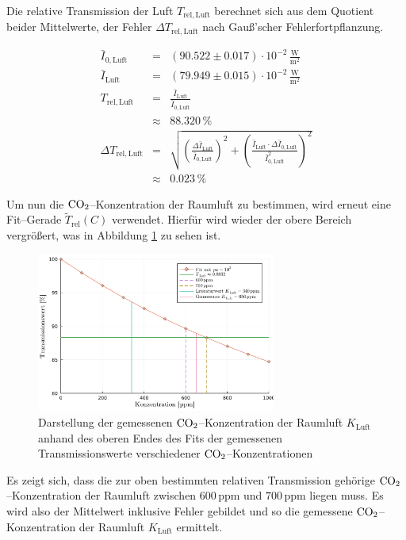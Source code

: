 \documentclass[12pt,a4paper]{scrartcl}
\numberwithin{equation}{section} %
\begin{document}
	Die relative Transmission der Luft $T_\mathrm{rel, Luft}$ berechnet sich aus dem Quotient beider Mittelwerte, der Fehler $\Delta T_\mathrm{rel, Luft}$ nach Gauß'scher Fehlerfortpflanzung.
	
	\begin{eqnarray}
		\bar{I}_{0, \mathrm{Luft}} &=& (90.522\pm 0.017) \cdot 10^{-2} \mathrm{\,\frac{W}{m^2}}\\
		\bar{I}_\mathrm{Luft} &=& (79.949 \pm 0.015) \cdot 10^{-2} \mathrm{\, \frac{W}{m^2}} \\
		T_\mathrm{rel, Luft} &=& \frac{\bar{I}_\mathrm{Luft}}{\bar{I}_{0, \mathrm{Luft}}} \\
		&\approx& 88.320 \mathrm{\, \%} \\
		\Delta T_\mathrm{rel, Luft} &=&
		\sqrt{
			\left(
			\frac{\Delta \bar{I}_\mathrm{Luft}}{\bar{I}_{0, \mathrm{Luft}}}
			\right)^2
			+ \left(
			\frac{\bar{I}_\mathrm{Luft} \cdot \Delta \bar{I}_{0, \mathrm{Luft}}}{\bar{I}_{0, \mathrm{Luft}}^2}
			\right)^2
		} \\
		&\approx& 0.023 \mathrm{\, \%}
	\end{eqnarray}
	
	\noindent
	Um nun die $\ce{CO_2}$--Konzentration der Raumluft zu bestimmen, wird erneut eine Fit--Gerade $\tilde{T}_\mathrm{rel}(C)$ verwendet. Hierfür wird wieder der obere Bereich vergrößert, was in Abbildung \ref{fig:luftZoom} zu sehen ist.
	
	\begin{figure}[h!]
		\centering
		\includegraphics[width=0.7\textwidth]{../media/B1.1/luftZoomPpm.pdf}
		\caption{Darstellung der gemessenen $\ce{CO_2}$--Konzentration der Raumluft $K_\mathrm{Luft}$ anhand des oberen Endes des Fits der gemessenen Transmissionswerte verschiedener $\ce{CO_2}$--Konzentrationen}
		\label{fig:luftZoom}
	\end{figure}
	
	Es zeigt sich, dass  die zur oben bestimmten relativen Transmission gehörige $\ce{CO_2}$--Konzentration der Raumluft zwischen $600 \mathrm{\, ppm}$ und $700 \mathrm{\, ppm}$ liegen muss. Es wird also der Mittelwert inklusive Fehler gebildet und so die gemessene $\ce{CO_2}$--Konzentration der Raumluft $K_\mathrm{Luft}$ ermittelt.
	
\end{document}
